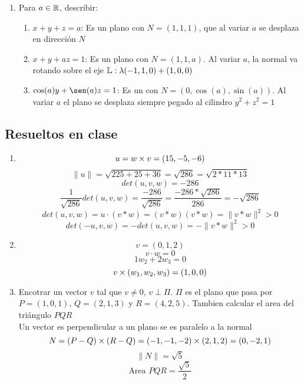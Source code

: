 \documentclass[../practica.root.tex]{subfiles}
\begin{document}
\begin{enumerate}
    \item Para $a \in \mathbb{R}$, describir:
          \begin{enumerate}
              \item $x + y + z = a$: Es un plano con $N = (1, 1, 1)$, que al variar $a$ se desplaza en dirección $N$
              \item $x + y + az = 1$: Es un plano con $N = (1, 1, a)$. Al variar $a$, la normal va rotando sobre el eje $\mathbb{L} : \lambda(-1,1,0) + (1, 0, 0)$
              \item $\cos(a)y + \sen(a)z = 1$: Es un con $N = (0, \cos(a), \sin(a))$. Al variar $a$ el plano se desplaza siempre pegado al cilindro $y^2 + z^2 = 1$
          \end{enumerate}



\end{enumerate}

\subsection{Resueltos en clase}
\begin{enumerate}
    \item
          \[ u = w \times v = (15,-5,-6) \]
          \[ \| u \| = \sqrt{225 + 25 + 36} = \sqrt{286} = \sqrt{2 * 11 * 13} \]
          \[ det(u,v,w) = -286 \]
          \[ \frac{1}{\sqrt{286}}det(u,v,w) = \frac{-286}{\sqrt{286}} = \frac{-286*\sqrt{286}}{286} = -\sqrt{286} \]
          \[ det(u,v,w) = u\cdot(v*w) = (v*w)(v*w) = \|v*w\|^2 > 0 \]
          \[ det(-u,v,w) = -det(u,v,w) = -\|v*w\|^2 > 0 \]

    \item
          \[ v = (0,1,2) \]
          \[ v\cdot w = 0 \]
          \[ 1w_2 + 2w_3 = 0 \]
          \[ v\times(w_1, w_2, w_3) = (1,0,0) \]

    \item Encotrar un vector $v$ tal que $v \neq 0$, $v \perp \Pi$. $\Pi$ es
          el plano que pasa por $P = (1,0,1)$, $Q = (2, 1, 3)$ y $R = (4, 2, 5)$. Tambien calcular el area del triángulo $PQR$ \\
          Un vector es perpendicular a un plano se es paralelo a la normal
          \[ N = (P-Q)\times(R-Q) = (-1,-1,-2)\times(2,1,2) = (0,-2,1) \]
          \[ \|N\| = \sqrt{5} \]
          \[ \text{Area }PQR = \frac{\sqrt{5}}{2} \]

\end{enumerate}
\end{document}
